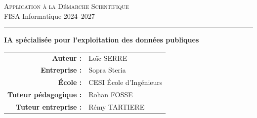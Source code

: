 \documentclass[12pt,a4paper,twoside]{report}
\begin{document}

\begin{titlepage}
    \centering
    
    \vspace*{0.5cm}
    {\large\textsc{Application à la Démarche Scientifique}}\\[0.15cm]
    {\small FISA Informatique 2024--2027}\\[0.4cm]
    {\color{gray}\rule{\textwidth}{0.8pt}}
    
    \vspace{2cm}
    
    {\Huge\bfseries IA spécialisée pour l'exploitation des données publiques}\\[0.3cm]
    
    
    \vspace{1.5cm}
    
    \begin{minipage}{0.6\textwidth}
        \centering
        \begin{tabular}{>{\small\bfseries}r >{\small}l}
            Auteur : & Loïc SERRE \\[0.15cm]
            Entreprise : & Sopra Steria \\[0.15cm]
            École : & CESI École d'Ingénieurs \\[0.15cm]
            Tuteur pédagogique : & Rohan FOSSE \\[0.15cm]
            Tuteur entreprise : & Rémy TARTIERE \\
        \end{tabular}
    \end{minipage}
    

\end{titlepage}
\end{document}
